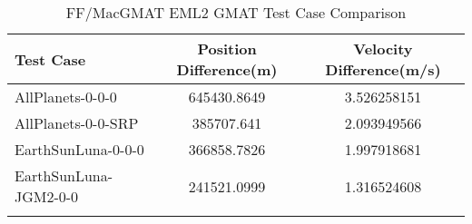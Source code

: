 \begin{table}[htbp!]
\centering
\caption{ FF/MacGMAT EML2 GMAT Test Case Comparison}
      \begin{tabular}{lcc}
      \hline\hline
          Test Case & Position Difference(m) & Velocity Difference(m/s) \\
         \hline
         AllPlanets-0-0-0 & 645430.8649 & 3.526258151 \\
         AllPlanets-0-0-SRP & 385707.641 & 2.093949566 \\
         EarthSunLuna-0-0-0 & 366858.7826 & 1.997918681 \\
         EarthSunLuna-JGM2-0-0 & 241521.0999 & 1.316524608 \\
      \hline\hline
      \label{Table: EML2 GMAT Table} 
\end{tabular}
\end{table}
